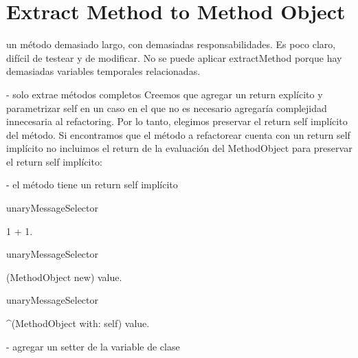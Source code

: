 \section{Extract Method to Method Object}

un método demasiado largo, con demasiadas responsabilidades. Es poco claro, difícil de testear y de
modificar. No se puede aplicar extractMethod porque hay demasiadas variables temporales
relacionadas.


- solo extrae métodos completos
Creemos que agregar un return explícito y parametrizar self en un caso en el que no es necesario
agregaría complejidad innecesaria al refactoring. Por lo tanto, elegimos preservar el return self
implícito del método. Si encontramos que el método a refactorear cuenta con un return self implícito
no incluimos el return de la evaluación del MethodObject para preservar el return self implícito:

- el método tiene un return self implícito

\begin{code}

unaryMessageSelector

 1 + 1.

unaryMessageSelector
 
 (MethodObject new) value.

unaryMessageSelector

 ^(MethodObject with: self) value.

\end{code}

- agregar un setter de la variable de clase